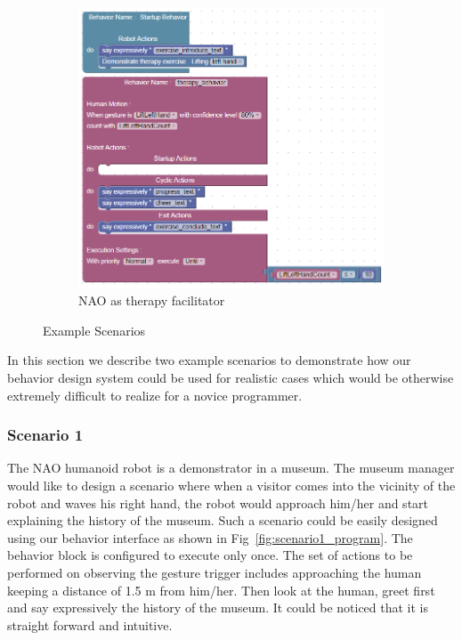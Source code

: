 \documentclass{llncs}
\begin{document}
\begin{figure}
\begin{subfigure}[t]{0.7\textwidth}
\includegraphics[width=\textwidth]{../thesis/assets/scenario2.png}
\caption[NAO as therapy facilitator]{NAO as therapy facilitator}
\label{fig:scenario2_program}
\end{subfigure}
\caption[Example Scenarios]{Example Scenarios}
\label{fig:scenarios}
\end{figure}
In this section we describe two example scenarios to demonstrate how our behavior design system could be used for realistic cases which would be otherwise extremely difficult to realize for a novice programmer.
\subsubsection{Scenario 1}%
The NAO humanoid robot is a demonstrator in a museum. The museum manager would like to design a scenario where when a visitor comes into the vicinity of the robot and waves his right hand, the robot would approach him/her and start explaining the history of the museum. Such a scenario could be easily designed using our behavior interface as shown in Fig~\ref{fig:scenario1_program}. The behavior block is configured to execute only once. The set of actions to be performed on observing the gesture trigger includes approaching the human keeping a distance of 1.5 m from him/her. Then look at the human, greet first and say expressively the  history of the museum. It could be noticed that it is straight forward and intuitive.%
\end{document}
